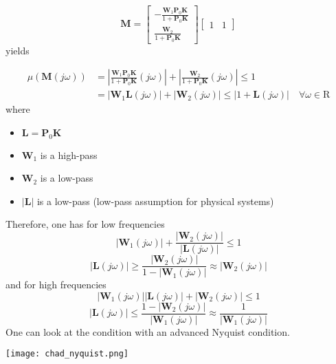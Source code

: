 
\begin{equation*}
    \mathbf{M}=\begin{bmatrix}
        -\frac{\mathbf{W}_1\mathbf{P}_0\mathbf{K}}{1+\mathbf{P}_0\mathbf{K}} \\
        \frac{\mathbf{W}_2}{1+\mathbf{P}_0\mathbf{K}}
    \end{bmatrix}
    \begin{bmatrix}
        1 & 1
    \end{bmatrix}
\end{equation*}
yields

\begin{align*}
    \mu(\mathbf{M}(j\omega)) & =\left|\frac{\mathbf{W}_1\mathbf{P}_0\mathbf{K}}{1+\mathbf{P}_0\mathbf{K}}(j\omega)\right|+\left|\frac{\mathbf{W}_2}{1+\mathbf{P}_0\mathbf{K}}(j\omega)\right|\leq1 \\
                             & =|\mathbf{W}_1 \mathbf{L}(j\omega)|+|\mathbf{W}_2(j\omega)|\leq|1+\mathbf{L}(j\omega)|\quad\forall\omega\in\mathrm{R}
\end{align*}
where
\begin{itemize}
    \item $\mathbf{L}=\mathbf{P}_0 \mathbf{K}$
    \item $\mathbf{W}_1$ is a high-pass
    \item $\mathbf{W}_2$ is a low-pass
    \item $|\mathbf{L}|$ is a low-pass (low-pass assumption for physical systems)
\end{itemize}
Therefore, one has for low frequencies
\begin{equation*}
    |\mathbf{W}_1(j\omega)|+\frac{|\mathbf{W}_2(j\omega)|}{|\mathbf{L}(j\omega)|}\leq1
\end{equation*}
\begin{equation*}
    |\mathbf{L}(j\omega)|\geq\frac{|\mathbf{W}_2(j\omega)|}{1-|\mathbf{W}_1(j\omega)|}\approx|\mathbf{W}_2(j\omega)|
\end{equation*}
and for high frequencies
\begin{equation*}
    |\mathbf{W}_1(j\omega)||\mathbf{L}(j\omega)|+|\mathbf{W}_2(j\omega)|\leq1
\end{equation*}
\begin{equation*}
    |\mathbf{L}(j\omega)|\leq\frac{1-|\mathbf{W}_2(j\omega)|}{|\mathbf{W}_1(j\omega)|}\approx\frac1{|\mathbf{W}_1(j\omega)|}
\end{equation*}
One can look at the condition with an advanced Nyquist condition.
\begin{center}
    \texttt{[image: chad\_nyquist.png]}
\end{center}

